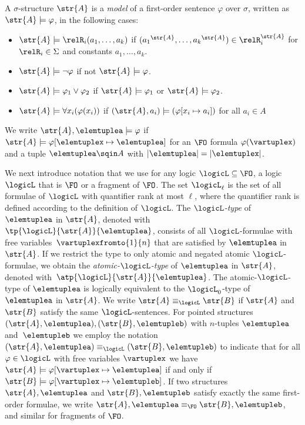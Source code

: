 \begin{definition}
  A $\sigma$-structure $\str{A}$ is a \emph{model} of a first-order sentence $\varphi$ over $\sigma$, written as $\str{A} \models \varphi$, in the following cases:
\begin{itemize}
  \item $\str{A} \models \relR_{i}(a_{1}, \ldots, a_{k})$ if $({a_{1}}^{\str{A}}, \ldots, {a_{k}}^{\str{A}}) \in \relR_{i}^{\str{A}}$ for $\relR_{i} \in \Sigma$ and constants $a_{1}, \ldots, a_{k}$.
  \item $\str{A} \models \neg \varphi$ if not $\str{A} \models \varphi$.
  \item $\str{A} \models \varphi_{1} \lor \varphi_{2}$ if $\str{A} \models \varphi_{1}$ or $\str{A} \models \varphi_{2}$.
  \item $\str{A} \models \forall{x_{i}} (\varphi(x_{i}))$ if $(\str{A}, a_{i}) \models (\varphi[x_{i} \mapsto a_{i}])$ for all $a_{i} \in A$
\end{itemize}
We write $\str{A}, \elemtuplea \models \varphi$ if $\str{A} \models \varphi[\elemtuplex \mapsto \elemtuplea]$ for an $\FO$ formula $\varphi(\vartuplex)$ and a tuple $\elemtuplea \sqin A$ with $|\elemtuplea| = |\elemtuplex|$.
\end{definition}

We next introduce notation that we use for any logic $\logicL \subseteq \FO$, \ie{} a logic $\logicL$ that is $\FO$ or a fragment of $\FO$.
The set $\logicL_{\ell}$ is the set of all formulae of $\logicL$ with quantifier rank at most $\ell$, where the quantifier rank is defined according to the definition of $\logicL$.
The \emph{$\logicL$-type} of $\elemtuplea$ in $\str{A}$, denoted with~$\tp{\logicL}{\str{A}}{\elemtuplea}$, consists of all $\logicL$-formulae with free variables~$\vartuplexfromto{1}{n}$ that are satisfied by $\elemtuplea$ in $\str{A}$.
If we restrict the type to only atomic and negated atomic $\logicL$-formulae, we obtain the \emph{atomic-$\logicL$-type} of $\elemtuplea$ in $\str{A}$, denoted with~$\atp{\logicL}{\str{A}}{\elemtuplea}$.
The atomic-$\logicL$-type of $\elemtuplea$ is logically equivalent to the $\logicL_{0}$-type of $\elemtuplea$ in $\str{A}$.
We write $\str{A} \equiv_\logicL \str{B}$ if $\str{A}$ and~$\str{B}$ satisfy the same $\logicL$-sentences.
For pointed structures $(\str{A}, \elemtuplea), (\str{B}, \elemtupleb)$ with $n$-tuples $\elemtuplea$ and~$\elemtupleb$ we employ the notation $(\str{A}, \elemtuplea) \equiv_\logicL (\str{B}, \elemtupleb)$ to indicate that for all $\varphi \in \logicL$ with free variables $\vartuplex$ we have $\str{A} \models \varphi[\vartuplex \mapsto \elemtuplea]$ if and only if $\str{B} \models \varphi[\vartuplex \mapsto \elemtupleb]$.
If two structures $\str{A}, \elemtuplea$ and $\str{B}, \elemtupleb$ satisfy exactly the same first-order formulae, we write $\str{A}, \elemtuplea \equiv_{\FO} \str{B}, \elemtupleb$, and similar for fragments of $\FO$.

